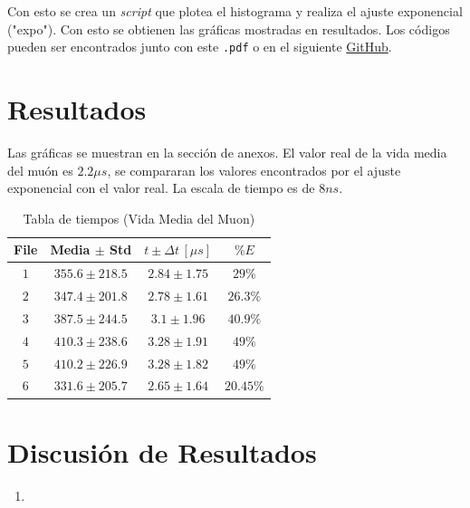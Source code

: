 \documentclass[conference]{IEEEtran}
\begin{document}
Con esto se crea un \textit{script} que plotea el histograma y realiza el ajuste exponencial ("expo"). Con esto se obtienen las gráficas mostradas en resultados. Los códigos pueden ser encontrados junto con este \texttt{.pdf} o en el siguiente \href{https://github.com/DSarceno/Semestre9/tree/main/Laboratorio\%20Avanzado}{GitHub}.
        
        
        
        
\section{Resultados}
    Las gráficas se muestran en la sección de anexos. El valor real de la vida media del muón es $2.2\mu s$, se compararan los valores encontrados por el ajuste exponencial con el valor real. La escala de tiempo es de $8ns$.
    \begin{table}[H]
    	\centering
    	\caption{Tabla de tiempos (Vida Media del Muon)}
		\label{table:tiempos}
		\begin{tabular}{||c||c|c|c||}
			\hline
			\hline
			File & Media $\pm$ Std   & $t\pm \Delta t\, [\mu s]$ & $\% E$      \\
			\hline
			\hline
			$1$    & $355.6 \pm 218.5$ & $2.84 \pm 1.75$         & $29\%$    \\
			$2$    & $347.4 \pm 201.8$ & $2.78\pm 1.61$          & $26.3\%$  \\
			$3$    & $387.5 \pm 244.5$ & $3.1\pm 1.96$           & $40.9\%$  \\
			$4$    & $410.3\pm 238.6$  & $3.28\pm 1.91$          & $49\%$    \\
			$5$    & $410.2\pm 226.9$  & $3.28\pm 1.82$          & $49\%$    \\
			$6$    & $331.6\pm 205.7$  & $2.65\pm 1.64$          & $20.45\%$ \\
			\hline
			\hline
		\end{tabular}
	\end{table}
    
    
    
\section{Discusión de Resultados}
\begin{enumerate}
    \item 
  
\end{enumerate}
\end{document}
